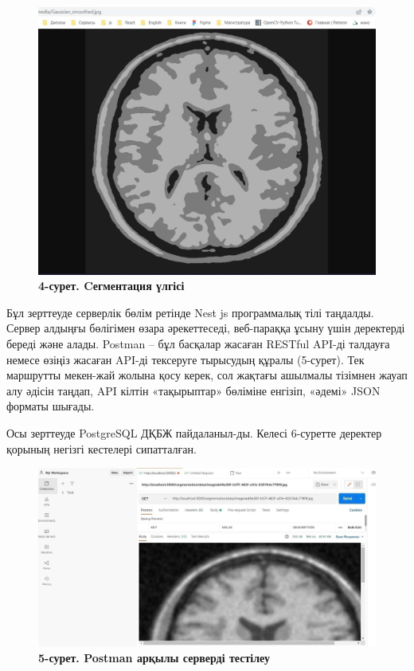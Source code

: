 \begin{figure}[H]
\begin{minipage}{0.45\textwidth}
      \includegraphics[width=1\textwidth]{assets/195}
      \caption*{}
  \end{minipage}

  \caption*{\bfseries4-сурет. Cегментация үлгісі}
\end{figure}

\begin{multicols}{2}

Бұл зерттеуде серверлік бөлім ретінде Nest js программалық тілі
таңдалды. Сервер алдыңғы бөлігімен өзара әрекеттеседі, веб-параққа ұсыну
үшін деректерді береді және алады. Postman -- бұл басқалар жасаған
RESTful API-ді талдауға немесе өзіңіз жасаған API-ді тексеруге тырысудың
құралы (5-сурет). Тек маршрутты мекен-жай жолына қосу керек, сол жақтағы
ашылмалы тізімнен жауап алу әдісін таңдап, API кілтін «тақырыптар»
бөліміне енгізіп, «әдемі» JSON форматы шығады.

Осы зерттеуде PostgreSQL ДҚБЖ пайдаланыл-ды. Келесі 6-суретте деректер
қорының негізгі кестелері сипатталған.
\end{multicols}

\begin{figure}[H]
	\centering
	\includegraphics[width=1\textwidth]{assets/196}
	\caption*{\bfseries 5-сурет. Postman арқылы серверді тестілеу}
\end{figure}


